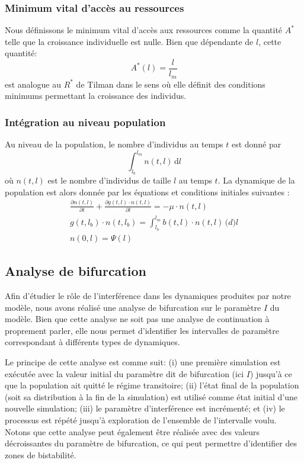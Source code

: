 \subsubsection{Minimum vital d'accès au ressources}
Nous définissons le minimum vital d'accès aux ressources comme la quantité $A^*$
telle que la croissance individuelle est nulle. Bien que dépendante de $l$,
cette quantité:
\begin{equation}
\label{eq_an4}
A^*(l) = \frac{l}{l_m}
\end{equation}
est analogue au $R^*$ de Tilman dans le sens où elle définit des conditions
minimums permettant la croissance des individus. 

\subsubsection{Intégration au niveau population}

Au niveau de la population, le nombre d'individus au temps $t$ est donné par
\begin{equation}
\label{eq_an5}
\int_{l_b}^{l_m}\!n(t,l)\,\mathrm{d}l
\end{equation}
où $n(t,l)$ est le nombre d'individus de taille $l$ au temps $t$. La dynamique
de la population est alors donnée par les équations et conditions initiales
suivantes \autocites{kooijman1984a,de-roos1997a}:
\begin{align}
\label{eq_an6}
\frac{\partial n(t,l)}{\partial t}+\frac{\partial g(t,l) \cdot n(t,l)}{\partial l}=-\mu \cdot n(t,l) \\
g(t,l_b) \cdot n(t,l_b)= \int_{l_b} ^{l_m} \! b(t,l)\cdot n(t,l)\, \mathrm(d)l
\\ n(0,l)=\Psi(l)
\end{align}

\subsection{Analyse de bifurcation}

Afin d'étudier le rôle de l'interférence dans les dynamiques produites par notre
modèle, nous avons réalisé une analyse de bifurcation sur le paramètre $I$ du
modèle. Bien que cette analyse ne soit pas une analyse de continuation à
proprement parler, elle nous permet d'identifier les intervalles de paramètre
correspondant à différents types de dynamiques. 

Le principe de cette analyse est comme suit: (i) une première simulation est
exécutée avec la valeur initial du paramètre dit de bifurcation (ici $I$)
jusqu'à ce que la population ait quitté le régime transitoire; (ii) l'état final
de la population (soit sa distribution à la fin de la simulation) est utilisé
comme état initial d'une nouvelle simulation; (iii) le paramètre d'interférence
est incrémenté; et (iv) le processus est répété jusqu'à exploration de
l'ensemble de l'intervalle voulu. Notons que cette analyse peut également être
réalisée avec des valeurs décroissantes du paramètre de bifurcation, ce qui peut
permettre d'identifier des zones de bistabilité. 

